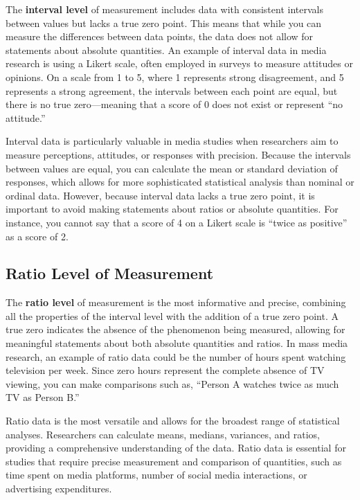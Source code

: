 \documentclass[
]{book}
\begin{document}
The \textbf{interval level} of measurement includes data with consistent intervals between values but lacks a true zero point. This means that while you can measure the differences between data points, the data does not allow for statements about absolute quantities. An example of interval data in media research is using a Likert scale, often employed in surveys to measure attitudes or opinions. On a scale from 1 to 5, where 1 represents strong disagreement, and 5 represents a strong agreement, the intervals between each point are equal, but there is no true zero---meaning that a score of 0 does not exist or represent ``no attitude.''

Interval data is particularly valuable in media studies when researchers aim to measure perceptions, attitudes, or responses with precision. Because the intervals between values are equal, you can calculate the mean or standard deviation of responses, which allows for more sophisticated statistical analysis than nominal or ordinal data. However, because interval data lacks a true zero point, it is important to avoid making statements about ratios or absolute quantities. For instance, you cannot say that a score of 4 on a Likert scale is ``twice as positive'' as a score of 2.

\subsection*{Ratio Level of Measurement}\label{ratio-level-of-measurement}

The \textbf{ratio level} of measurement is the most informative and precise, combining all the properties of the interval level with the addition of a true zero point. A true zero indicates the absence of the phenomenon being measured, allowing for meaningful statements about both absolute quantities and ratios. In mass media research, an example of ratio data could be the number of hours spent watching television per week. Since zero hours represent the complete absence of TV viewing, you can make comparisons such as, ``Person A watches twice as much TV as Person B.''

Ratio data is the most versatile and allows for the broadest range of statistical analyses. Researchers can calculate means, medians, variances, and ratios, providing a comprehensive understanding of the data. Ratio data is essential for studies that require precise measurement and comparison of quantities, such as time spent on media platforms, number of social media interactions, or advertising expenditures.
\end{document}
